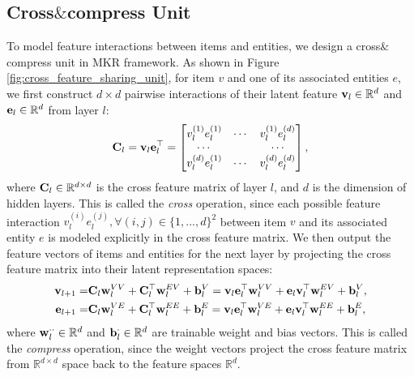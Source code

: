 \documentclass[sigconf]{acmart}
\begin{document}
	
	\subsection{Cross$\&$compress Unit}
To model feature interactions between items and entities, we design a cross$\&$compress unit in MKR framework.
		As shown in Figure \ref{fig:cross_feature_sharing_unit}, for item $v$ and one of its associated entities $e$, we first construct $d \times d$ pairwise interactions of their latent feature ${\bf v}_l \in \mathbb R^d$ and ${\bf e}_l \in \mathbb R^d$ from layer $l$:
		\begin{equation}
		\label{eq:cross}
			{\bf C}_l = {\bf v}_l {\bf e}_l^\top =
			\begin{bmatrix}
   				v_l^{(1)} e_l^{(1)} & \cdots & v_l^{(1)} e_l^{(d)}\\
   				\cdots & & \cdots\\
   				v_l^{(d)} e_l^{(1)} & \cdots & v_l^{(d)} e_l^{(d)}
  			\end{bmatrix},
		\end{equation}
		where ${\bf C}_l \in \mathbb R^{d \times d}$ is the cross feature matrix of layer $l$, and $d$ is the dimension of hidden layers.
		This is called the \textit{cross} operation, since each possible feature interaction $v_l^{(i)} e_l^{(j)}, \forall (i, j) \in \{1, ..., d\}^2$ between item $v$ and its associated entity $e$ is modeled explicitly in the cross feature matrix.
		We then output the feature vectors of items and entities for the next layer by projecting the cross feature matrix into their latent representation spaces:
		\begin{equation}
		\label{eq:compress}
		\begin{split}
			{\bf v}_{l+1} =& {\bf C}_l {\bf w}_l^{VV} + {\bf C}_l^\top {\bf w}_l^{EV} + {\bf b}_l^V = {\bf v}_l {\bf e}_l^\top {\bf w}_l^{VV} + {\bf e}_l {\bf v}_l^\top {\bf w}_l^{EV} + {\bf b}_l^V,\\
			{\bf e}_{l+1} =& {\bf C}_l {\bf w}_l^{VE} + {\bf C}_l^\top {\bf w}_l^{EE} + {\bf b}_l^E = {\bf v}_l {\bf e}_l^\top {\bf w}_l^{VE} + {\bf e}_l {\bf v}_l^\top {\bf w}_l^{EE} + {\bf b}_l^E,
		\end{split}
		\end{equation}
		where ${\bf w}_l^{\cdot \cdot} \in \mathbb R^d$ and ${\bf b}_l^\cdot \in \mathbb R^d$ are trainable weight and bias vectors.
		This is called the \textit{compress} operation, since the weight vectors project the cross feature matrix from $\mathbb R^{d \times d}$ space back to the feature spaces $\mathbb R^d$.
\end{document}
